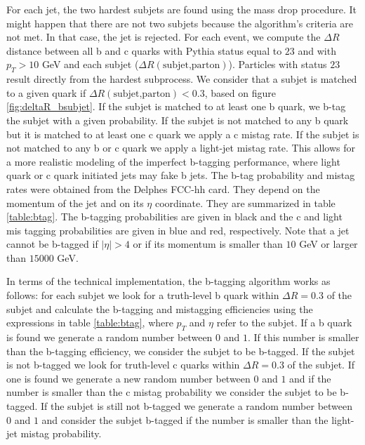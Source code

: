 For each jet, the two hardest subjets are found using the mass drop procedure. It might happen that there are not two subjets because the algorithm's criteria are not met. In that case, the jet is rejected. For each event, we compute the $\Delta R$ distance between all b and c quarks with Pythia status equal to $23$ \cite{Pythia6manual} and with $p_T>10$ GeV and each subjet ($\Delta R(\text{subjet,parton})$). Particles with status $23$ result directly from the hardest subprocess. We consider that a subjet is matched to a given quark if $\Delta R(\text{subjet,parton})<0.3$, based on figure \ref{fig:deltaR_bsubjet}. If the subjet is matched to at least one b quark, we b-tag the subjet with a given probability. If the subjet is not matched to any b quark but it is matched to at least one c quark we apply a c mistag rate. If the subjet is not matched to any b or c quark we apply a light-jet mistag rate. This allows for a more realistic modeling of the imperfect b-tagging performance, where light quark or c quark initiated jets may fake b jets. The b-tag probability and mistag rates were obtained from the Delphes FCC-hh card. They depend on the momentum of the jet and on its $\eta$ coordinate. They are summarized in table \ref{table:btag}. The b-tagging probabilities are given in black and the c and light mis tagging probabilities are given in blue and red, respectively. Note that a jet cannot be b-tagged if $|\eta|>4$ or if its momentum is smaller than $10$ GeV or larger than $15000$ GeV.

In terms of the technical implementation, the b-tagging algorithm works as follows: for each subjet we look for a truth-level b quark within $\Delta R=0.3$ of the subjet and calculate the b-tagging and mistagging efficiencies using the expressions in table \ref{table:btag}, where $p_T$ and $\eta$ refer to the subjet. If a b quark is found we generate a random number between $0$ and $1$. If this number is smaller than the b-tagging efficiency, we consider the subjet to be b-tagged. If the subjet is not b-tagged we look for truth-level c quarks within $\Delta R=0.3$ of the subjet. If one is found we generate a new random number between $0$ and $1$ and if the number is smaller than the c mistag probability we consider the subjet to be b-tagged. If the subjet is still not b-tagged we generate a random number between $0$ and $1$ and consider the subjet b-tagged if the number is smaller than the light-jet mistag probability. 

